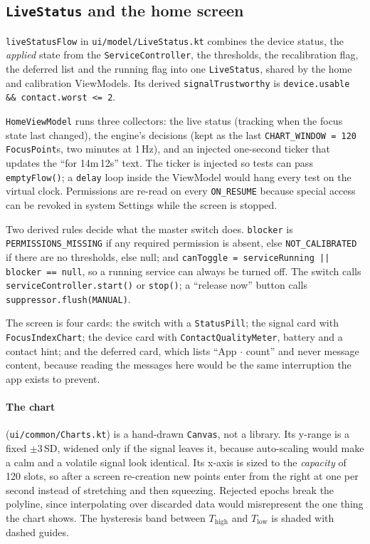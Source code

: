 \documentclass[10pt,a4paper]{article}
\newcommand{\file}[1]{\texttt{\small #1}}          %
\newcommand{\code}[1]{\texttt{#1}}                  %
\newcommand{\Thigh}{T_{\mathrm{high}}}
\newcommand{\Tlow}{T_{\mathrm{low}}}
\begin{document}
\subsection{\code{LiveStatus} and the home screen}

\code{liveStatusFlow} in \file{ui/model/LiveStatus.kt} combines the device status, the
\emph{applied} state from the \code{ServiceController}, the thresholds, the recalibration flag,
the deferred list and the running flag into one \code{LiveStatus}, shared by the home and
calibration ViewModels. Its derived \code{signalTrustworthy} is \code{device.usable \&\&
contact.worst <= 2}.

\code{HomeViewModel} runs three collectors: the live status (tracking when the focus state last
changed), the engine's decisions (kept as the last \code{CHART\_WINDOW = 120} \code{FocusPoint}s,
two minutes at 1\,Hz), and an injected one-second ticker that updates the ``for 14m\,12s'' text.
The ticker is injected so tests can pass \code{emptyFlow()}; a \code{delay} loop inside the
ViewModel would hang every test on the virtual clock. Permissions are re-read on every
\code{ON\_RESUME} because special access can be revoked in system Settings while the screen is
stopped.

Two derived rules decide what the master switch does. \code{blocker} is
\code{PERMISSIONS\_MISSING} if any required permission is absent, else \code{NOT\_CALIBRATED} if
there are no thresholds, else null; and \code{canToggle = serviceRunning || blocker == null}, so a
running service can always be turned off. The switch calls \code{serviceController.start()} or
\code{stop()}; a ``release now'' button calls \code{suppressor.flush(MANUAL)}.

The screen is four cards: the switch with a \code{StatusPill}; the signal card with
\code{FocusIndexChart}; the device card with \code{ContactQualityMeter}, battery and a contact
hint; and the deferred card, which lists ``App $\cdot$ count'' and never message content, because
reading the messages here would be the same interruption the app exists to prevent.

\paragraph{The chart} (\file{ui/common/Charts.kt}) is a hand-drawn \code{Canvas}, not a library.
Its y-range is a fixed $\pm3$\,SD, widened only if the signal leaves it, because auto-scaling would
make a calm and a volatile signal look identical. Its x-axis is sized to the \emph{capacity} of 120
slots, so after a screen re-creation new points enter from the right at one per second instead of
stretching and then squeezing. Rejected epochs break the polyline, since interpolating over
discarded data would misrepresent the one thing the chart shows. The hysteresis band between
$\Thigh$ and $\Tlow$ is shaded with dashed guides.
\end{document}
